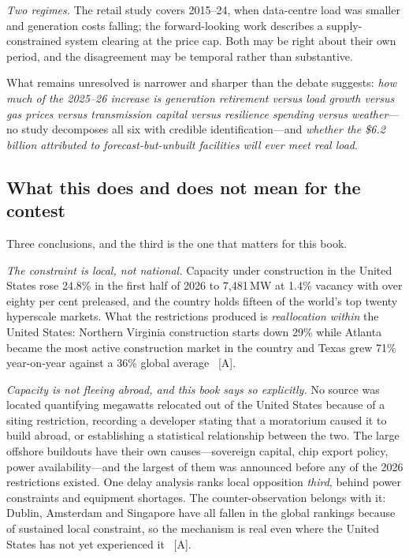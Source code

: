 \emph{Two regimes.} The retail study covers 2015--24, when data-centre load was smaller and generation costs falling; the forward-looking work describes a supply-constrained system clearing at the price cap. Both may be right about their own period, and the disagreement may be temporal rather than substantive.

What remains unresolved is narrower and sharper than the debate suggests: \emph{how much of the 2025--26 increase is generation retirement versus load growth versus gas prices versus transmission capital versus resilience spending versus weather}---no study decomposes all six with credible identification---and \emph{whether the \$6.2 billion attributed to forecast-but-unbuilt facilities will ever meet real load}.

\subsection{What this does and does not mean for the contest}

Three conclusions, and the third is the one that matters for this book.

\emph{The constraint is local, not national.} Capacity under construction in the United States rose 24.8\% in the first half of 2026 to 7,481\,MW at 1.4\% vacancy with over eighty per cent preleased, and the country holds fifteen of the world's top twenty hyperscale markets. What the restrictions produced is \emph{reallocation within} the United States: Northern Virginia construction starts down 29\% while Atlanta became the most active construction market in the country and Texas grew 71\% year-on-year against a 36\% global average~\cite{us-capacity-not-fleeing} [A].

\emph{Capacity is not fleeing abroad, and this book says so explicitly.} No source was located quantifying megawatts relocated out of the United States because of a siting restriction, recording a developer stating that a moratorium caused it to build abroad, or establishing a statistical relationship between the two. The large offshore buildouts have their own causes---sovereign capital, chip export policy, power availability---and the largest of them was announced before any of the 2026 restrictions existed. One delay analysis ranks local opposition \emph{third}, behind power constraints and equipment shortages. The counter-observation belongs with it: Dublin, Amsterdam and Singapore have all fallen in the global rankings because of sustained local constraint, so the mechanism is real even where the United States has not yet experienced it~\cite{us-capacity-not-fleeing} [A].

